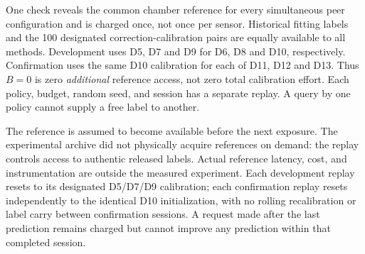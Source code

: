 One check reveals the common chamber reference for every simultaneous peer configuration and is charged once, not once per sensor. Historical fitting labels and the 100 designated correction-calibration pairs are equally available to all methods. Development uses D5, D7 and D9 for D6, D8 and D10, respectively. Confirmation uses the same D10 calibration for each of D11, D12 and D13. Thus $B=0$ is zero \emph{additional} reference access, not zero total calibration effort. Each policy, budget, random seed, and session has a separate replay. A query by one policy cannot supply a free label to another.

The reference is assumed to become available before the next exposure. The experimental archive did not physically acquire references on demand: the replay controls access to authentic released labels. Actual reference latency, cost, and instrumentation are outside the measured experiment. Each development replay resets to its designated D5/D7/D9 calibration; each confirmation replay resets independently to the identical D10 initialization, with no rolling recalibration or label carry between confirmation sessions. A request made after the last prediction remains charged but cannot improve any prediction within that completed session.

